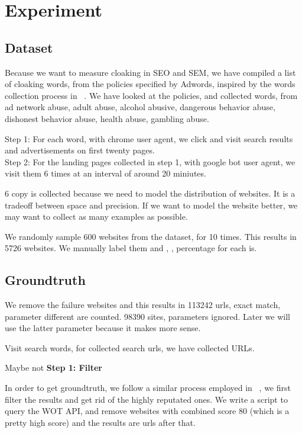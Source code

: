 \section{Experiment}
\label{s:experiment}



\subsection{Dataset}


Because we want to measure cloaking in SEO and SEM, we have compiled a list of
cloaking words, from the policies specified by Adwords, inspired by the words
collection process in ~\cite{wang2011cloak}. We have looked at the policies, and
collected  words, from ad network abuse, adult abuse, alcohol abusive, dangerous behavior
abuse, dishonest behavior abuse, health abuse, gambling abuse.

Step 1: For each word, with chrome user agent, we click and visit search results and advertisements on first
twenty pages. \\
Step 2: For the landing pages collected in step 1, with google bot user agent, we visit them 6 times at an
interval of around 20 miniutes.

6 copy is collected because we need to model the distribution of websites. It is
a tradeoff between space and precision. If we want to model the website better,
we may want to collect as many examples as possible.


We randomly sample 600 websites from the dataset, for 10 times. This results in
5726 websites. We manually label them and , , percentage
for each is.


\subsection{Groundtruth}

We remove the failure websites and this results in 
113242 urls, exact match, parameter different are counted.
98390 sites, parameters ignored. Later we will use the latter parameter because
it makes more sense.


Visit  search words, for collected search urls, we have collected
 URLs.


Maybe not
\bf{Step 1: Filter}

In order to get groundtruth, we follow a similar process employed in
~\cite{lin2009detection}, we first filter the results and get rid of the highly reputated ones. We write a
script to query the WOT API, and remove websites with combined score 80
(which is a pretty high score) and the results are  urls after that.

